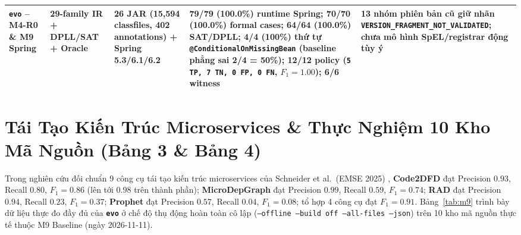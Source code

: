 \documentclass[10pt,a4paper]{article}
\begin{document}
\begin{table}[htbp]
\begin{tabularx}{\textwidth}{>{\raggedright\arraybackslash}p{2.7cm} >{\raggedright\arraybackslash}p{2.4cm} >{\raggedright\arraybackslash}p{3.0cm} >{\raggedright\arraybackslash}X >{\raggedright\arraybackslash}p{3.5cm}}
\textbf{\texttt{evo} -- M4-R0 \& M9 Spring} & \textbf{29-family IR + DPLL/SAT + Oracle} & \textbf{26 JAR (15,594 classfiles, 402 annotations) + Spring 5.3/6.1/6.2} & \textbf{79/79 (100.0\%) runtime Spring; 70/70 (100.0\%) formal cases; 64/64 (100.0\%) SAT/DPLL; 4/4 (100\%) thứ tự \texttt{@ConditionalOnMissingBean} (baseline phẳng sai 2/4 = 50\%); 12/12 policy (\texttt{5 TP, 7 TN, 0 FP, 0 FN}, $F_1 = \mathbf{1.00}$); 6/6 witness} & \textbf{13 nhóm phiên bản cũ giữ nhãn \texttt{VERSION\_FRAGMENT\_NOT\_VALIDATED}; chưa mô hình SpEL/registrar động tùy ý} \\
\bottomrule
\end{tabularx}
\end{table}

\section{Tái Tạo Kiến Trúc Microservices & Thực Nghiệm 10 Kho Mã Nguồn (Bảng 3 & Bảng 4)}

Trong nghiên cứu đối chuẩn 9 công cụ tái tạo kiến trúc microservices của Schneider et al.\ (EMSE 2025) \cite{schneider2025comparison}, \textbf{Code2DFD} đạt Precision $0.93$, Recall $0.80$, $F_1 = 0.86$ (lên tới $0.98$ trên thành phần); \textbf{MicroDepGraph} đạt Precision $0.99$, Recall $0.59$, $F_1 = 0.74$; \textbf{RAD} đạt Precision $0.94$, Recall $0.23$, $F_1 = 0.37$; \textbf{Prophet} đạt Precision $0.57$, Recall $0.04$, $F_1 = 0.08$; tổ hợp 4 công cụ đạt $F_1 = 0.91$. Bảng~\ref{tab:m9} trình bày dữ liệu thực đo đầy đủ của \textbf{\texttt{evo}} ở chế độ thụ động hoàn toàn cô lập (\texttt{--offline --build off --all-files --json}) trên 10 kho mã nguồn thực tế thuộc M9 Baseline (ngày 2026-11-11).
\end{document}
